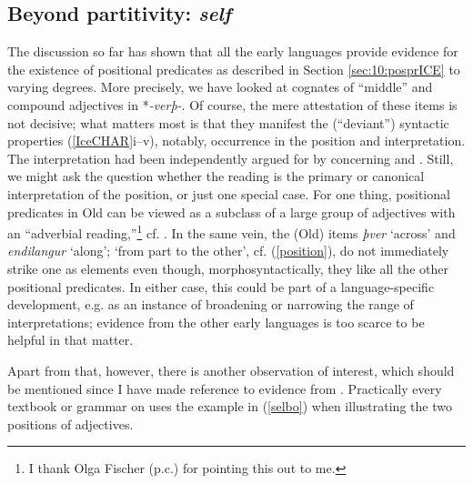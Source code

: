 \documentclass[output=paper,colorlinks,citecolor=brown]{langscibook}
\begin{document}
\subsection{Beyond partitivity:  \textit{self}}
\label{sec:10:self}

The discussion so far has shown that all the early  languages provide evidence for the existence of positional predicates as described in Section \ref{sec:10:posprICE} to varying degrees. More precisely, we have looked at cognates of ``middle'' and compound adjectives in *\textit{-verþ-}. Of course, the mere attestation of these items is not decisive; what matters most is that they manifest the (``deviant'') syntactic properties (\ref{IceCHAR}i--v), notably, occurrence in the  position and  interpretation. The  interpretation had been independently argued for by \citet{Marib} concerning  and . Still, we might ask the question whether the  reading is the primary or canonical interpretation of the  position, or just one special case. For one thing, positional predicates in Old  can be viewed as a subclass of a large group of adjectives with an ``adverbial reading,''\footnote{I thank Olga Fischer (p.c.) for pointing this out to me.} cf. \citet{Fischer01,Grabski17,Grabski20}. In the same vein, the (Old)  items \textit{þver} `across' and \textit{endilangur} `along'; `from part to the other', cf. (\ref{position}), do not immediately strike one as  elements even though, morphosyntactically, they  like all the other positional predicates. In either case, this could be part of a language-specific development, e.g. as an instance of broadening or narrowing the range of interpretations; evidence from the other early  languages is too scarce to be helpful in that matter.

\begin{sloppypar}
Apart from that, however, there is another observation of interest, which should be mentioned since I have made reference to evidence from .  
Practically every textbook or grammar on  uses the example in (\ref{selbo}) when illustrating the two positions of adjectives.
\end{sloppypar}
\end{document}
